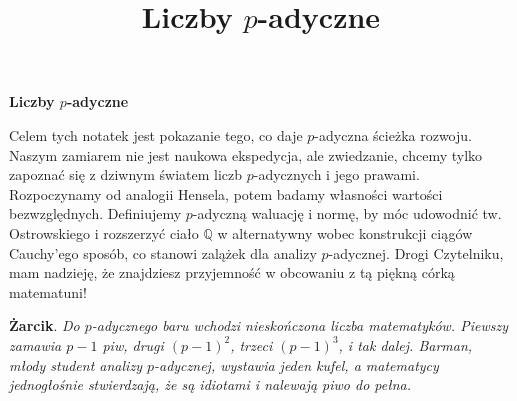 \documentclass[a4paper,fleqn]{article}
\title{\textbf{Liczby $p$-adyczne}}
\author{}
\date{}
\begin{document}
\begin{multicols}{2}
\begin{center}\textbf{\huge Liczby $p$-adyczne}\end{center}

Celem tych notatek jest pokazanie tego, co daje $p$-adyczna ścieżka rozwoju. Naszym zamiarem nie jest naukowa ekspedycja, ale zwiedzanie, chcemy tylko zapoznać się z dziwnym światem liczb $p$-adycznych i jego prawami. Rozpoczynamy od analogii Hensela, potem badamy własności wartości bezwzględnych. Definiujemy $p$-adyczną waluację i normę, by móc udowodnić tw. Ostrowskiego i rozszerzyć ciało $\mathbb Q$ w alternatywny wobec konstrukcji ciągów Cauchy'ego sposób, co stanowi zalążek dla analizy $p$-adycznej. Drogi Czytelniku, mam nadzieję, że znajdziesz przyjemność w obcowaniu z tą piękną córką matematuni!

\textbf{Żarcik}. \emph{Do $p$-adycznego baru wchodzi nieskończona liczba matematyków. Piewszy zamawia $p-1$ piw, drugi $(p-1)^2$, trzeci $(p-1)^3$, i tak dalej. Barman, młody student analizy $p$-adycznej, wystawia jeden kufel, a matematycy jednogłośnie stwierdzają, że są idiotami i nalewają piwo do pełna.}



\end{multicols}
\end{document}
